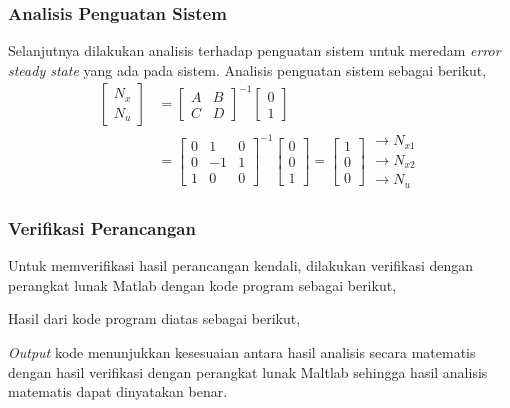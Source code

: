 \documentclass[../main.tex]{subfiles}
\begin{document}
            \subsubsection{Analisis Penguatan Sistem}
                Selanjutnya dilakukan analisis terhadap penguatan sistem untuk meredam \textit{error steady state} yang ada pada sistem. Analisis penguatan sistem sebagai berikut,
                \begin{equation}
                    \begin{split}
                        \begin{bmatrix} N_x \\ N_u \end{bmatrix} &= \begin{bmatrix} A & B \\ C & D \end{bmatrix}^{-1} \begin{bmatrix} 0 \\ 1 \end{bmatrix} \\[5pt]
                    &= \begin{bmatrix} 0 & 1 & 0 \\ 0 & -1 & 1 \\ 1 & 0 & 0 \end{bmatrix}^{-1} \begin{bmatrix} 0 \\ 0 \\ 1 \end{bmatrix} = \begin{bmatrix} 1 \\ 0 \\ 0 \end{bmatrix} \begin{matrix} \rightarrow N_{x1} \\ \rightarrow N_{x2} \\ \rightarrow N_{u}\end{matrix}
                    \end{split}
                \end{equation}
            \subsubsection{Verifikasi Perancangan}
                Untuk memverifikasi hasil perancangan kendali, dilakukan verifikasi dengan perangkat lunak Matlab dengan kode program sebagai berikut,
                
                Hasil dari kode program diatas sebagai berikut,
                
                \textit{Output} kode menunjukkan kesesuaian antara hasil analisis secara matematis dengan hasil verifikasi dengan perangkat lunak Maltlab sehingga hasil analisis matematis dapat dinyatakan benar.
\end{document}
